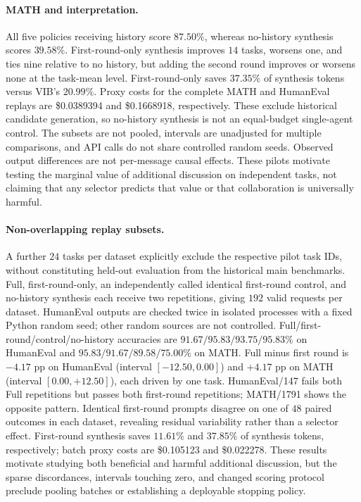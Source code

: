 \documentclass[11pt,twoside,twocolumn,letterpaper]{article}
\begin{document}
\paragraph{MATH and interpretation.} All five policies receiving history score $87.50\%$, whereas no-history synthesis scores $39.58\%$. First-round-only synthesis improves $14$ tasks, worsens one, and ties nine relative to no history, but adding the second round improves or worsens none at the task-mean level. First-round-only saves $37.35\%$ of synthesis tokens versus VIB's $20.99\%$. Proxy costs for the complete MATH and HumanEval replays are \$0.0389394 and \$0.1668918, respectively. These exclude historical candidate generation, so no-history synthesis is not an equal-budget single-agent control. The subsets are not pooled, intervals are unadjusted for multiple comparisons, and API calls do not share controlled random seeds. Observed output differences are not per-message causal effects. These pilots motivate testing the marginal value of additional discussion on independent tasks, not claiming that any selector predicts that value or that collaboration is universally harmful.

\paragraph{Non-overlapping replay subsets.} A further $24$ tasks per dataset explicitly exclude the respective pilot task IDs, without constituting held-out evaluation from the historical main benchmarks. Full, first-round-only, an independently called identical first-round control, and no-history synthesis each receive two repetitions, giving $192$ valid requests per dataset. HumanEval outputs are checked twice in isolated processes with a fixed Python random seed; other random sources are not controlled. Full/first-round/control/no-history accuracies are $91.67/95.83/93.75/95.83\%$ on HumanEval and $95.83/91.67/89.58/75.00\%$ on MATH. Full minus first round is $-4.17$ pp on HumanEval (interval $[-12.50,0.00]$) and $+4.17$ pp on MATH (interval $[0.00,+12.50]$), each driven by one task. HumanEval/147 fails both Full repetitions but passes both first-round repetitions; MATH/1791 shows the opposite pattern. Identical first-round prompts disagree on one of $48$ paired outcomes in each dataset, revealing residual variability rather than a selector effect. First-round synthesis saves $11.61\%$ and $37.85\%$ of synthesis tokens, respectively; batch proxy costs are \$0.105123 and \$0.022278. These results motivate studying both beneficial and harmful additional discussion, but the sparse discordances, intervals touching zero, and changed scoring protocol preclude pooling batches or establishing a deployable stopping policy.
\end{document}
